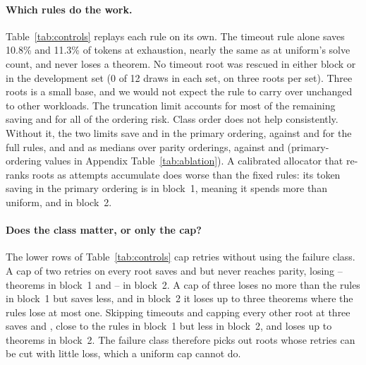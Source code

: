 \paragraph{Which rules do the work.}
Table~\ref{tab:controls} replays each rule on its own.  The timeout rule alone saves 10.8\% and 11.3\% of tokens at exhaustion, nearly the same as at uniform's solve count, and never loses a theorem.  No timeout root was rescued in either block or in the development set (0 of 12 draws in each set, on three roots per set).  Three roots is a small base, and we would not expect the rule to carry over unchanged to other workloads.  The truncation limit accounts for most of the remaining saving and for all of the ordering risk.  Class order does not help consistently.  Without it, the two limits save \CrBOneCoarsePrimary{} and \CrBTwoCoarsePrimary{} in the primary ordering, against \SchedBOneSavings{} and \SchedBTwoSavings{} for the full rules, and \CrBOneCoarseParityMedian{} and \CrBTwoCoarseParityMedian{} as medians over parity orderings, against \SchedBOneOrderMedian{} and \SchedBTwoOrderMedian{} (primary-ordering values in Appendix Table~\ref{tab:ablation}).  A calibrated allocator that re-ranks roots as attempts accumulate does worse than the fixed rules: its token saving in the primary ordering is \SchedCalibratedBOne{} in block~1, meaning it spends more than uniform, and \SchedCalibratedBTwo{} in block~2.

\paragraph{Does the class matter, or only the cap?}
The lower rows of Table~\ref{tab:controls} cap retries without using the failure class.  A cap of two retries on every root saves \CrBOneCapTwoExhMedian{} and \CrBTwoCapTwoExhMedian{} but never reaches parity, losing \CrBOneCapTwoMinLoss{}--\CrBOneCapTwoMaxLoss{} theorems in block~1 and \CrBTwoCapTwoMinLoss{}--\CrBTwoCapTwoMaxLoss{} in block~2.  A cap of three loses no more than the rules in block~1 but saves less, and in block~2 it loses up to three theorems where the rules lose at most one.  Skipping timeouts and capping every other root at three saves \CrBOneToCapThreeExhMedian{} and \CrBTwoToCapThreeExhMedian{}, close to the rules in block~1 but less in block~2, and loses up to \CrBTwoToCapThreeMaxLoss{} theorems in block~2.  The failure class therefore picks out roots whose retries can be cut with little loss, which a uniform cap cannot do.

